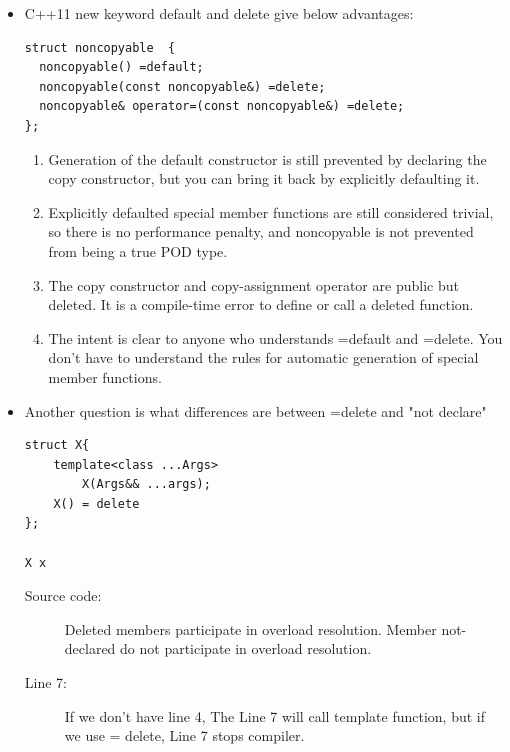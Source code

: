 \documentclass[a4paper,11pt,twoside]{book}
\begin{document}
\begin{itemize}
\item C++11 new keyword default and delete give below advantages:
\begin{lstlisting}[numbers=none]
struct noncopyable  {
  noncopyable() =default;
  noncopyable(const noncopyable&) =delete;
  noncopyable& operator=(const noncopyable&) =delete;
};
\end{lstlisting}

\begin{enumerate}
	\item Generation of the default constructor is still prevented by declaring the copy constructor, but you can bring it back by explicitly defaulting it.

	\item Explicitly defaulted special member functions are still considered trivial, so there is no performance penalty, and noncopyable is not prevented from being a true POD type.

	\item The copy constructor and copy-assignment operator are public but deleted. It is a compile-time error to define or call a deleted function.

	\item The intent is clear to anyone who understands =default and =delete. You don't have to understand the rules for automatic generation of special member functions.
\end{enumerate}

	\item Another question is what differences are between =delete and "not declare"
\begin{lstlisting}
struct X{
	template<class ...Args>
		X(Args&& ...args);
	X() = delete
};

X x 
\end{lstlisting}
\begin{description}
	\item[Source code:] Deleted members participate in overload resolution. Member not-declared do not participate in overload resolution.	
	\item[Line 7:] If we don't have line 4, The Line 7 will call template function, but if we use = delete, Line 7 stops compiler.  
\end{description}


\end{itemize}
\end{document}
